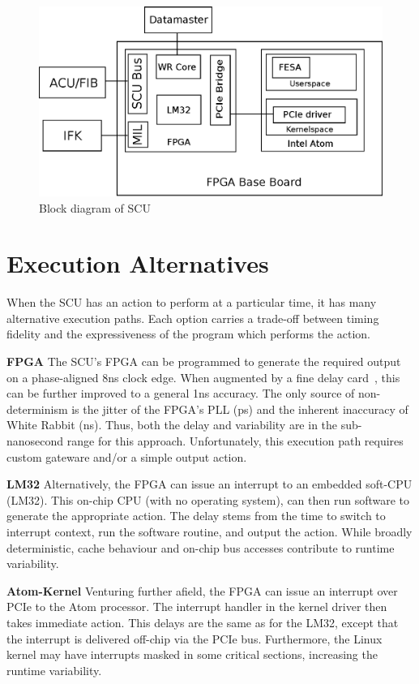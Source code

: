\documentclass{JAC2003}
\begin{document}
\begin{figure}[t]
   \centering
   \includegraphics*[width=\columnwidth]{scu_schema}
   \caption{Block diagram of SCU}
\end{figure}


\section{Execution Alternatives}
When the SCU has an action to perform at a particular time, 
it has many alternative execution paths.
Each option carries a trade-off between timing fidelity and 
the expressiveness of the program which performs the action.

\textbf{FPGA} 
The SCU's FPGA can be programmed to generate the required output
on a phase-aligned 8ns clock edge. 
When augmented by a fine delay card~\cite{cern-fine-delay},
this can be further improved to a general 1ns accuracy.
The only source of non-determinism is the jitter of the FPGA's PLL (ps) 
and the inherent inaccuracy of White Rabbit (ns).
Thus, both the delay and variability are in the sub-nanosecond range 
for this approach.
Unfortunately, this execution path requires custom gateware and/or
a simple output action.

\textbf{LM32} 
Alternatively, the FPGA can issue an interrupt to an embedded soft-CPU (LM32).
This on-chip CPU (with no operating system), 
can then run software to generate the appropriate action.
The delay stems from the time to switch to interrupt context,
run the software routine,
and output the action.
While broadly deterministic,
cache behaviour and on-chip bus accesses contribute to runtime variability.

\textbf{Atom-Kernel}
Venturing further afield,
the FPGA can issue an interrupt over PCIe to the Atom processor.
The interrupt handler in the kernel driver then takes immediate action.
This delays are the same as for the LM32, 
except that the interrupt is delivered off-chip via the PCIe bus.
Furthermore, 
the Linux kernel may have interrupts masked in some critical sections,
increasing the runtime variability.
\end{document}

